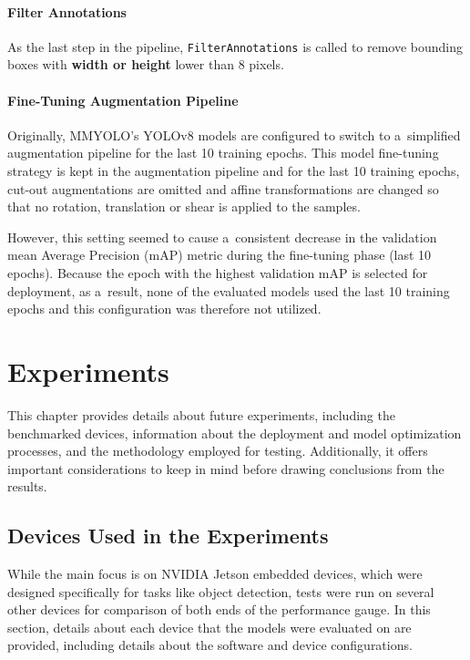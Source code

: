 \subsubsection*{Filter Annotations}

As the last step in the pipeline, \texttt{FilterAnnotations} is called to remove
bounding boxes with \textbf{width or height} lower than \num{8} pixels.


\subsubsection{Fine-Tuning Augmentation Pipeline}

Originally, MMYOLO's YOLOv8 models are configured to switch to a~simplified
augmentation pipeline for the last 10 training epochs. This model fine-tuning
strategy is kept in the augmentation pipeline and for the last 10 training
epochs, cut-out augmentations are omitted and affine transformations are changed
so that no rotation, translation or shear is applied to the samples.

However, this setting seemed to cause a~consistent decrease in the validation
mean Average Precision (mAP) metric during the fine-tuning phase (last 10
epochs). Because the epoch with the highest validation mAP is selected for
deployment, as a~result, none of the evaluated models used the last 10 training
epochs and this configuration was therefore not utilized.




\chapter{Experiments}
\label{Experiments}

This chapter provides details about future experiments, including the
benchmarked devices, information about the deployment and model optimization
processes, and the methodology employed for testing. Additionally, it offers
important considerations to keep in mind before drawing conclusions from the
results.


\section{Devices Used in the Experiments}

While the main focus is on NVIDIA Jetson embedded devices, which were designed
specifically for tasks like object detection, tests were run on several other
devices for comparison of both ends of the performance gauge. In this section,
details about each device that the models were evaluated on are provided,
including details about the software and device configurations.


